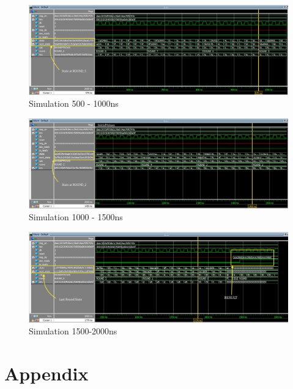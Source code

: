 \documentclass[journal, twocolumn, final,11pt,letterpaper]{IEEEtran}
\begin{document}
\begin{figure} [H]
	\centering
	\includegraphics[scale=.35]{simulate-500-1000.png}
	\caption{Simulation 500 - 1000ns\label{fig:500-1000}}
\end{figure}          


\begin{figure} [H]
	\centering
	\includegraphics[scale=.35]{simulate-1000-1500.png}
	\caption{Simulation 1000 - 1500ns\label{fig:1000-1500}}
\end{figure}          


\begin{figure} [H]
	\centering
	\includegraphics[scale=.35]{simulate-1500-2000.png}
	\caption{Simulation 1500-2000ns\label{fig:1500-2000}}
\end{figure}          


     

\section*{Appendix}
%
\end{document}
